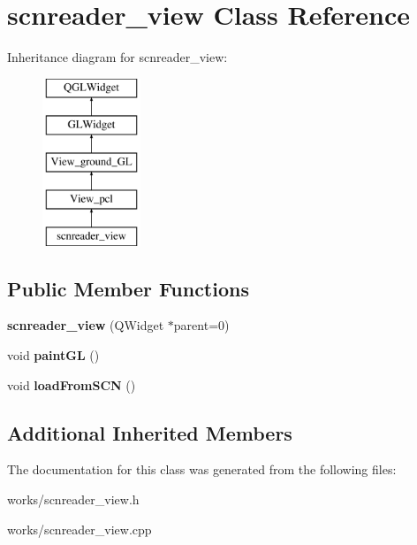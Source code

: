 \hypertarget{classscnreader__view}{\section{scnreader\-\_\-view Class Reference}
\label{classscnreader__view}
}
Inheritance diagram for scnreader\-\_\-view\-:\begin{figure}[H]
\begin{center}
\leavevmode
\includegraphics[height=5.000000cm]{classscnreader__view}
\end{center}
\end{figure}
\subsection*{Public Member Functions}
\begin{DoxyCompactItemize}
\item 
\hypertarget{classscnreader__view_a3b20e7436fedcf438de209200005b974}{{\bfseries scnreader\-\_\-view} (Q\-Widget $\ast$parent=0)}\label{classscnreader__view_a3b20e7436fedcf438de209200005b974}

\item 
\hypertarget{classscnreader__view_a977fd9239e1cf795da0d1720b8e192d1}{void {\bfseries paint\-G\-L} ()}\label{classscnreader__view_a977fd9239e1cf795da0d1720b8e192d1}

\item 
\hypertarget{classscnreader__view_a108b2d99a8fb80d1f7b89cf3a81ddc30}{void {\bfseries load\-From\-S\-C\-N} ()}\label{classscnreader__view_a108b2d99a8fb80d1f7b89cf3a81ddc30}

\end{DoxyCompactItemize}
\subsection*{Additional Inherited Members}


The documentation for this class was generated from the following files\-:\begin{DoxyCompactItemize}
\item 
works/scnreader\-\_\-view.\-h\item 
works/scnreader\-\_\-view.\-cpp\end{DoxyCompactItemize}
